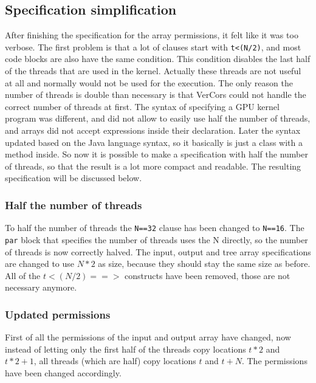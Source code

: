 \documentclass[a4paper]{article}
\newcommand{\code}[1]{\texttt{\small \color{inline}#1}} %
\begin{document}


\subsection{Specification simplification}
After finishing the specification for the array permissions, it felt like it was too verbose. The first problem is that a lot of clauses start with \code{t<(N/2)}, and most code blocks are also have the same condition. This condition disables the last half of the threads that are used in the kernel. Actually these threads are not useful at all and normally would not be used for the execution. The only reason the number of threads is double than necessary is that VerCors could not handle the correct number of threads at first. The syntax of specifying a GPU kernel program was different, and did not allow to easily use half the number of threads, and arrays did not accept expressions inside their declaration. Later the syntax updated based on the Java language syntax, so it basically is just a class with a method inside. So now it is possible to make a specification with half the number of threads, so that the result is a lot more compact and readable. The resulting specification will be discussed below.

\subsubsection{Half the number of threads}
To half the number of threads the \code{N==32} clause has been changed to \code{N==16}. The \code{par} block that specifies the number of threads uses the N directly, so the number of threads is now correctly halved. The input, output and tree array specifications are changed to use $N*2$ as size, because they should stay the same size as before. All of the $t<(N/2) ==>$ constructs have been removed, those are not necessary anymore.

\subsubsection{Updated permissions}
First of all the permissions of the input and output array have changed, now instead of letting only the first half of the threads copy locations $t*2$ and $t*2+1$, all threads (which are half) copy locations $t$ and $t+N$. The permissions have been changed accordingly.
\end{document}
